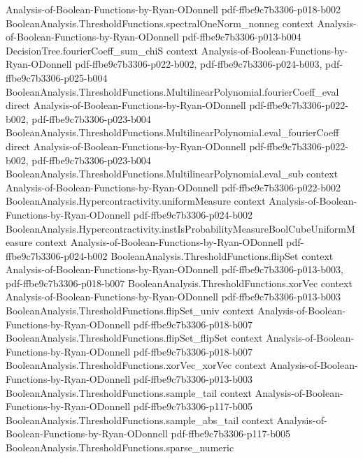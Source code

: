 \begin{theorem}
  {Analysis-of-Boolean-Functions-by-Ryan-ODonnell}
  {pdf-ffbe9c7b3306-p018-b002}
\proofstep
  {BooleanAnalysis.ThresholdFunctions.spectralOneNorm_nonneg}
  {context}
  {Analysis-of-Boolean-Functions-by-Ryan-ODonnell}
  {pdf-ffbe9c7b3306-p013-b004}
\proofstep
  {DecisionTree.fourierCoeff_sum_chiS}
  {context}
  {Analysis-of-Boolean-Functions-by-Ryan-ODonnell}
  {pdf-ffbe9c7b3306-p022-b002,
    pdf-ffbe9c7b3306-p024-b003,
    pdf-ffbe9c7b3306-p025-b004}
\proofstep
  {BooleanAnalysis.ThresholdFunctions.MultilinearPolynomial.fourierCoeff_eval}
  {direct}
  {Analysis-of-Boolean-Functions-by-Ryan-ODonnell}
  {pdf-ffbe9c7b3306-p022-b002,
    pdf-ffbe9c7b3306-p023-b004}
\proofstep
  {BooleanAnalysis.ThresholdFunctions.MultilinearPolynomial.eval_fourierCoeff}
  {direct}
  {Analysis-of-Boolean-Functions-by-Ryan-ODonnell}
  {pdf-ffbe9c7b3306-p022-b002,
    pdf-ffbe9c7b3306-p023-b004}
\proofstep
  {BooleanAnalysis.ThresholdFunctions.MultilinearPolynomial.eval_sub}
  {context}
  {Analysis-of-Boolean-Functions-by-Ryan-ODonnell}
  {pdf-ffbe9c7b3306-p022-b002}
\proofstep
  {BooleanAnalysis.Hypercontractivity.uniformMeasure}
  {context}
  {Analysis-of-Boolean-Functions-by-Ryan-ODonnell}
  {pdf-ffbe9c7b3306-p024-b002}
\proofstep
  {BooleanAnalysis.Hypercontractivity.instIsProbabilityMeasureBoolCubeUniformMeasure}
  {context}
  {Analysis-of-Boolean-Functions-by-Ryan-ODonnell}
  {pdf-ffbe9c7b3306-p024-b002}
\proofstep
  {BooleanAnalysis.ThresholdFunctions.flipSet}
  {context}
  {Analysis-of-Boolean-Functions-by-Ryan-ODonnell}
  {pdf-ffbe9c7b3306-p013-b003,
    pdf-ffbe9c7b3306-p018-b007}
\proofstep
  {BooleanAnalysis.ThresholdFunctions.xorVec}
  {context}
  {Analysis-of-Boolean-Functions-by-Ryan-ODonnell}
  {pdf-ffbe9c7b3306-p013-b003}
\proofstep
  {BooleanAnalysis.ThresholdFunctions.flipSet_univ}
  {context}
  {Analysis-of-Boolean-Functions-by-Ryan-ODonnell}
  {pdf-ffbe9c7b3306-p018-b007}
\proofstep
  {BooleanAnalysis.ThresholdFunctions.flipSet_flipSet}
  {context}
  {Analysis-of-Boolean-Functions-by-Ryan-ODonnell}
  {pdf-ffbe9c7b3306-p018-b007}
\proofstep
  {BooleanAnalysis.ThresholdFunctions.xorVec_xorVec}
  {context}
  {Analysis-of-Boolean-Functions-by-Ryan-ODonnell}
  {pdf-ffbe9c7b3306-p013-b003}
\proofstep
  {BooleanAnalysis.ThresholdFunctions.sample_tail}
  {context}
  {Analysis-of-Boolean-Functions-by-Ryan-ODonnell}
  {pdf-ffbe9c7b3306-p117-b005}
\proofstep
  {BooleanAnalysis.ThresholdFunctions.sample_abs_tail}
  {context}
  {Analysis-of-Boolean-Functions-by-Ryan-ODonnell}
  {pdf-ffbe9c7b3306-p117-b005}
\proofstep
  {BooleanAnalysis.ThresholdFunctions.sparse_numeric}

\end{theorem}
